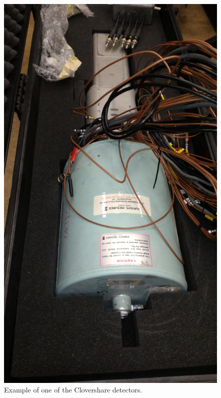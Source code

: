 \begin{figure}
    \centering
    \includegraphics[scale=0.1]{Setup_Figs/P_20160118_094821.jpg}
    \caption{Example of one of the Clovershare detectors.}
    \label{fig:clover_example}
\end{figure}